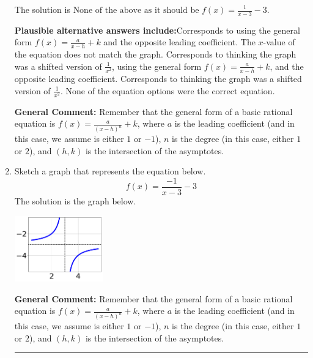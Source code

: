 \documentclass{extbook}[14pt]
\newcommand{\litem}[1]{\item #1

\rule{\textwidth}{0.4pt}}
\begin{document}
\begin{enumerate}
{The solution is \( \text{None of the above as it should be } f(x) = \frac{1}{x - 3} - 3 \).\begin{enumerate}[label=\Alph*.]
\textbf{Plausible alternative answers include:}Corresponds to using the general form $f(x) = \frac{a}{x-h}+k$ and the opposite leading coefficient.
The $x$-value of the equation does not match the graph.
Corresponds to thinking the graph was a shifted version of $\frac{1}{x^2}$, using the general form $f(x) = \frac{a}{x-h}+k$, and the opposite leading coefficient.
Corresponds to thinking the graph was a shifted version of $\frac{1}{x^2}$.
None of the equation options were the correct equation.
\end{enumerate}

\textbf{General Comment:} Remember that the general form of a basic rational equation is $ f(x) = \frac{a}{(x-h)^n} + k$, where $a$ is the leading coefficient (and in this case, we assume is either $1$ or $-1$), $n$ is the degree (in this case, either $1$ or $2$), and $(h, k)$ is the intersection of the asymptotes.
}
\litem{
Sketch a graph that represents the equation below.
\[ f(x) = \frac{-1}{x - 3} - 3 \]The solution is the graph below.
    \begin{center}
        \includegraphics[width=0.3\textwidth]{../Figures/rationalEquationToGraphCopyAC.png}
    \end{center}

\textbf{General Comment:} Remember that the general form of a basic rational equation is $ f(x) = \frac{a}{(x-h)^n} + k$, where $a$ is the leading coefficient (and in this case, we assume is either $1$ or $-1$), $n$ is the degree (in this case, either $1$ or $2$), and $(h, k)$ is the intersection of the asymptotes.
}
\end{enumerate}
\end{document}
